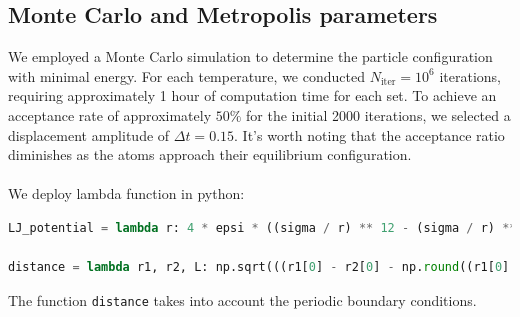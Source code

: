 \documentclass{article}
\begin{document}
\subsection{Monte Carlo and Metropolis parameters}
We employed a Monte Carlo simulation to determine the particle configuration with minimal energy. For each temperature, we conducted $N_{\text{iter}} = 10^6$ iterations, requiring approximately 1 hour of computation time for each set. To achieve an acceptance rate of approximately $50\%$ for the initial 2000 iterations, we selected a displacement amplitude of $\Delta t = 0.15$. It's worth noting that the acceptance ratio diminishes as the atoms approach their equilibrium configuration.\\\\
We deploy lambda function in python:
\begin{lstlisting}[language=Python]
LJ_potential = lambda r: 4 * epsi * ((sigma / r) ** 12 - (sigma / r) ** 6)

distance = lambda r1, r2, L: np.sqrt(((r1[0] - r2[0] - np.round((r1[0] - r2[0]) / L) * L)**2) + ((r1[1] - r2[1] - np.round((r1[1] - r2[1]) / L) * L)**2))
\end{lstlisting}
The function \texttt{distance} takes into account the periodic boundary conditions.
\end{document}
